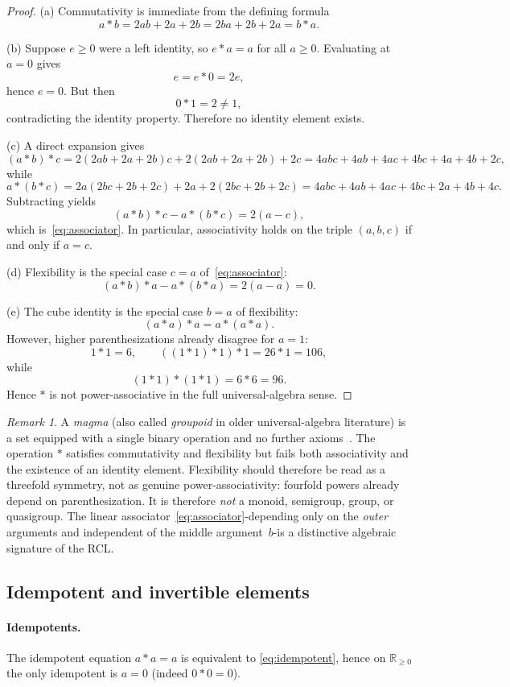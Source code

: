 \documentclass[11pt,reqno]{amsart}
\theoremstyle{plain}
\theoremstyle{definition}
\theoremstyle{remark}
\newtheorem{remark}[theorem]{Remark} %
\newcommand{\RR}{\mathbb{R}}
\newcommand{\1}{\mathbf{1}}
\newcommand{\paperadd}[1]{{\color{paperblue}#1}}
\begin{document}
{\color{paperblue}
\begin{proof}
(a) Commutativity is immediate from the defining formula
\[
a\ast b=2ab+2a+2b=2ba+2b+2a=b\ast a.
\]

(b) Suppose \(e\ge 0\) were a left identity, so \(e\ast a=a\) for all \(a\ge 0\).
Evaluating at \(a=0\) gives
\[
e=e\ast 0=2e,
\]
hence \(e=0\). But then
\[
0\ast 1=2\neq 1,
\]
contradicting the identity property. Therefore no identity element exists.

(c) A direct expansion gives
\[
(a\ast b)\ast c
=2(2ab+2a+2b)c+2(2ab+2a+2b)+2c
=4abc+4ab+4ac+4bc+4a+4b+2c,
\]
while
\[
a\ast (b\ast c)
=2a(2bc+2b+2c)+2a+2(2bc+2b+2c)
=4abc+4ab+4ac+4bc+2a+4b+4c.
\]
Subtracting yields
\[
(a\ast b)\ast c-a\ast(b\ast c)=2(a-c),
\]
which is~\eqref{eq:associator}. In particular, associativity holds on the triple
\((a,b,c)\) if and only if \(a=c\).

(d) Flexibility is the special case \(c=a\) of~\eqref{eq:associator}:
\[
(a\ast b)\ast a-a\ast(b\ast a)=2(a-a)=0.
\]

(e) The cube identity is the special case \(b=a\) of flexibility:
\[
(a\ast a)\ast a=a\ast(a\ast a).
\]
However, higher parenthesizations already disagree for \(a=1\):
\[
1\ast1=6,\qquad ((1\ast1)\ast1)\ast1 = 26\ast1 = 106,
\]
while
\[
(1\ast1)\ast(1\ast1)=6\ast6=96.
\]
Hence \(\ast\) is not power-associative in the full universal-algebra sense.
\end{proof}
}

\begin{remark}\label{rem:magma}
A \emph{magma} (also called \emph{groupoid} in older universal-algebra
literature) is a set equipped with a single binary operation and no
further axioms~\cite{bourbaki1970}.
The operation $\ast$ satisfies commutativity and flexibility but
fails both associativity and the existence of an identity element.
\paperadd{Flexibility should therefore be read as a threefold symmetry, not as genuine power-associativity: fourfold powers already depend on parenthesization.}
It is therefore \emph{not} a monoid, semigroup, group, or
quasigroup. The linear associator~\eqref{eq:associator}-depending
only on the \emph{outer} arguments and independent of the middle
argument~$b$-is a distinctive algebraic signature of the RCL.
\end{remark}

\subsection{Idempotent and invertible elements}\label{ssec:idemp-inv-2} \paragraph{Idempotents.} The idempotent equation $a\ast a=a$ is equivalent to \eqref{eq:idempotent}, hence on $\RR_{\ge0}$ the only idempotent is $a=0$ (indeed $0\ast0=0$).
\end{document}
